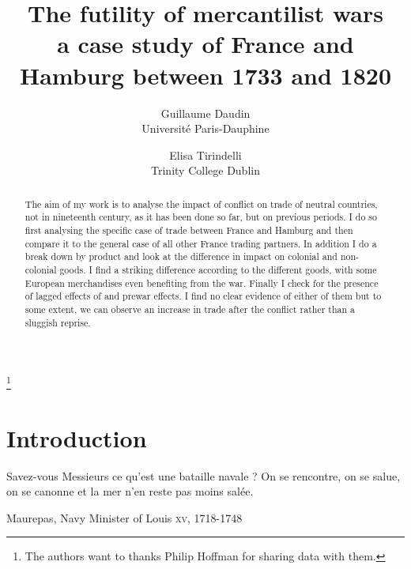 \documentclass[12pt,a4paper,titlepage,english]{article}
\author{
  Guillaume Daudin \\ Université Paris-Dauphine
  \and
  Elisa Tirindelli \\ Trinity College Dublin 
}
\title{The futility of mercantilist wars \\ a case study of France and Hamburg between 1733 and 1820}
\begin{document}
\thanks{The authors want to thanks Philip Hoffman for sharing data with them.}

\maketitle



\begin{abstract}
The aim of my work is to analyse the impact of conflict on trade of neutral countries, not in nineteenth century, as it has been done so far, but on previous periods. I do so first analysing the specific case of trade between France and Hamburg and then compare it to the general case of all other France trading partners. In addition I do a break down by product and look at the difference in impact on colonial and non-colonial goods. I find a striking difference according to the different goods, with some European merchandises even benefiting from the war. Finally I check for the presence of lagged effects of and prewar effects. I find no clear evidence of either of them but to some extent, we can observe an increase in trade after the conflict rather than a sluggish reprise. 
\end{abstract}


\section{Introduction}

\epigraph{Savez-vous Messieurs ce qu’est une bataille navale ? On se rencontre, on se salue, on se canonne et la mer n’en reste pas moins salée.}{Maurepas, Navy Minister of Louis  \textsc{xv}, 1718-1748}



\maketitle
\end{document}
